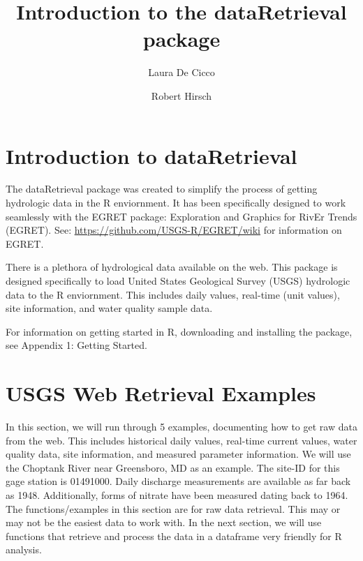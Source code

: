 \documentclass[a4paper,11pt]{article}
\begin{document}


\title{Introduction to the dataRetrieval package}
\author[1]{Laura De Cicco}
\author[1]{Robert Hirsch}



\maketitle
\tableofcontents

\section{Introduction to dataRetrieval}
The dataRetrieval package was created to simplify the process of getting hydrologic data in the R enviornment. It has been specifically designed to work seamlessly with the EGRET package: Exploration and Graphics for RivEr Trends (EGRET). See: \url{https://github.com/USGS-R/EGRET/wiki} for information on EGRET.

There is a plethora of hydrological data available on the web. This package is designed specifically to load United States Geological Survey (USGS) hydrologic data to the R enviornment. This includes daily values, real-time (unit values), site information, and water quality sample data. 

For information on getting started in R, downloading and installing the package, see Appendix 1: Getting Started.


\section{USGS Web Retrieval Examples}
In this section, we will run through 5 examples, documenting how to get raw data from the web. This includes historical daily values, real-time current values, water quality data, site information, and measured parameter information. We will use the Choptank River near Greensboro, MD as an example.  The site-ID for this gage station is 01491000. Daily discharge measurements are available as far back as 1948.  Additionally, forms of nitrate have been measured dating back to 1964. The functions/examples in this section are for raw data retrieval.  This may or may not be the easiest data to work with.  In the next section, we will use functions that retrieve and process the data in a dataframe very friendly for R analysis.
\end{document}
